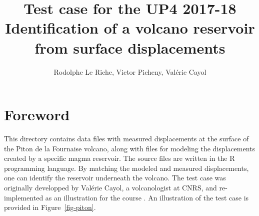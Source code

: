 \documentclass[12pt]{article}
\begin{document}
\title{Test case for the UP4 2017-18 \\ 
Identification of a volcano reservoir from surface displacements
}
\author{Rodolphe Le Riche, Victor Picheny, Valérie Cayol}
\maketitle

\tableofcontents

\section{Foreword}
This directory contains data files with measured displacements at the surface of the Piton de la Fournaise volcano, along with files for modeling the displacements created by a specific magma reservoir. The source files are written in the R programming language. 
By matching the modeled and measured displacements, one can identify the reservoir underneath the volcano.
The test case was originally developped by Valérie Cayol, a volcanologist at CNRS, and re-implemented as an illustration for the course \cite{durrande:cel-01618068}. 
An illustration of the test case is provided in Figure~\ref{fig-piton}.
\end{document}

